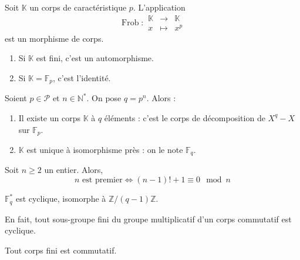   \begin{proposition}
    Soit $\mathbb{K}$ un corps de caractéristique $p$. L'application
    \[
      \operatorname{Frob} :
      \begin{array}{ccc}
        \mathbb{K} &\rightarrow& \mathbb{K} \\
        x &\mapsto& x^p
      \end{array}
    \]
    est un morphisme de corps.
    \begin{enumerate}[label=(\roman*)]
      \item Si $\mathbb{K}$ est fini, c'est un automorphisme.
      \item Si $\mathbb{K} = \mathbb{F}_p$, c'est l'identité.
    \end{enumerate}
  \end{proposition}

  \begin{theorem}
    Soient $p \in \mathcal{P}$ et $n \in \mathbb{N}^*$. On pose $q = p^n$. Alors :
    \begin{enumerate}[label=(\roman*)]
      \item Il existe un corps $\mathbb{K}$ à $q$ éléments : c'est le corps de décomposition de $X^q - X$ sur $\mathbb{F}_p$.
      \item $\mathbb{K}$ est unique à isomorphisme près : on le note $\mathbb{F}_q$.
    \end{enumerate}
  \end{theorem}

  \begin{corollary}
    Soit $n \geq 2$ un entier. Alors,
    \[ n \text{ est premier} \iff (n-1)!+1 \equiv 0 \mod n \]
  \end{corollary}


  \begin{theorem}
    $\mathbb{F}_q^*$ est cyclique, isomorphe à $\mathbb{Z}/(q-1)\mathbb{Z}$.
  \end{theorem}

  \begin{remark}
    En fait, tout sous-groupe fini du groupe multiplicatif d'un corps commutatif est cyclique.
  \end{remark}


  \begin{theorem}[Wedderburn]
    Tout corps fini est commutatif.
  \end{theorem}

